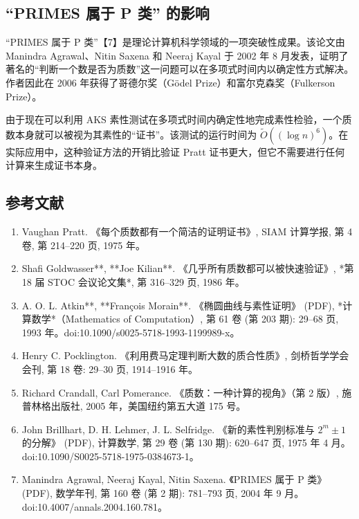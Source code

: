 \subsection{“PRIMES 属于 P 类” 的影响}

“PRIMES 属于 P 类”【7】是理论计算机科学领域的一项突破性成果。该论文由 Manindra Agrawal、Nitin Saxena 和 Neeraj Kayal 于 2002 年 8 月发表，证明了著名的“判断一个数是否为质数”这一问题可以在多项式时间内以确定性方式解决。作者因此在 2006 年获得了哥德尔奖（Gödel Prize）和富尔克森奖（Fulkerson Prize）。

由于现在可以利用 AKS 素性测试在多项式时间内确定性地完成素性检验，一个质数本身就可以被视为其素性的“证书”。该测试的运行时间为 $\tilde{O}((\log n)^6)$。在实际应用中，这种验证方法的开销比验证 Pratt 证书更大，但它不需要进行任何计算来生成证书本身。
\subsection{参考文献}
\begin{enumerate}
\item Vaughan Pratt. 《每个质数都有一个简洁的证明证书》, SIAM 计算学报, 第 4 卷, 第 214–220 页, 1975 年。
\item Shafi Goldwasser**, **Joe Kilian**. 《几乎所有质数都可以被快速验证》, *第 18 届 STOC 会议论文集*, 第 316–329 页, 1986 年。
\item A. O. L. Atkin**, **François Morain**. 《椭圆曲线与素性证明》 (PDF), *计算数学*（Mathematics of Computation）, 第 61 卷 (第 203 期): 29–68 页, 1993 年。doi:10.1090/s0025-5718-1993-1199989-x。
\item Henry C. Pocklington. 《利用费马定理判断大数的质合性质》, 剑桥哲学学会会刊, 第 18 卷: 29–30 页, 1914–1916 年。
\item Richard Crandall, Carl Pomerance. 《质数：一种计算的视角》（第 2 版）, 施普林格出版社, 2005 年，美国纽约第五大道 175 号。
\item John Brillhart, D. H. Lehmer, J. L. Selfridge. 《新的素性判别标准与 $2^m \pm 1$ 的分解》 (PDF), 计算数学, 第 29 卷 (第 130 期): 620–647 页, 1975 年 4 月。doi:10.1090/S0025-5718-1975-0384673-1。
\item Manindra Agrawal, Neeraj Kayal, Nitin Saxena. 《PRIMES 属于 P 类》 (PDF), 数学年刊, 第 160 卷 (第 2 期): 781–793 页, 2004 年 9 月。doi:10.4007/annals.2004.160.781。
\end{enumerate}
